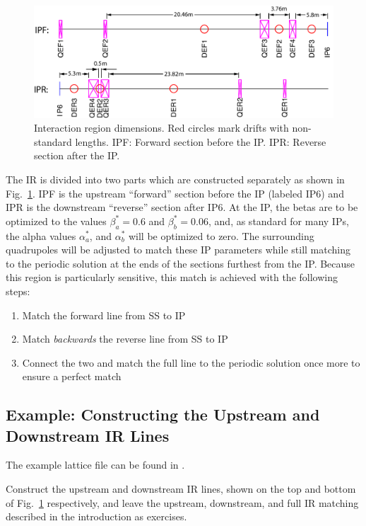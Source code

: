 \documentclass{hitec}     %
\begin{document}
{\begin{figure}[bt]
  \includegraphics[width=0.9\linewidth]{figures/irspecs.PDF}
  \caption{Interaction region dimensions. Red circles mark drifts with non-standard lengths. 
  IPF: Forward section before the IP. IPR: Reverse section after the IP.}
  \label{f:ir}
\end{figure}
The IR is divided into two parts which are constructed separately as shown in Fig.~\ref{f:ir}. 
IPF is the upstream ``forward'' section before the IP (labeled IP6) and  IPR is the downstream ``reverse'' section after IP6.
At the IP, the betas are to be optimized to the values $\beta_a^*=0.6$ and $\beta_b^*=0.06$, and,
as standard for many IPs, the alpha values $\alpha_a^*$, and $\alpha_b^*$ will be optimized to zero. 
The surrounding quadrupoles will be adjusted to match these IP parameters while still matching to the periodic solution at the ends of the sections furthest from the IP. 
Because this region is particularly sensitive, this match is achieved with the following steps:
\begin{enumerate}[leftmargin=*]
\item Match the forward line from SS to IP
%
\item Match \textit{backwards} the reverse line from SS to IP
%
\item Connect the two and match the full line to the periodic solution once more to ensure a perfect match
\end{enumerate}

\subsection{Example: Constructing the Upstream and Downstream IR Lines}
The example lattice file can be found in .

Construct the upstream and downstream IR lines, shown on the top and bottom of Fig.~\ref{f:ir} respectively, and leave the upstream, downstream, and full IR matching described in the introduction as exercises.

}
\end{document}
